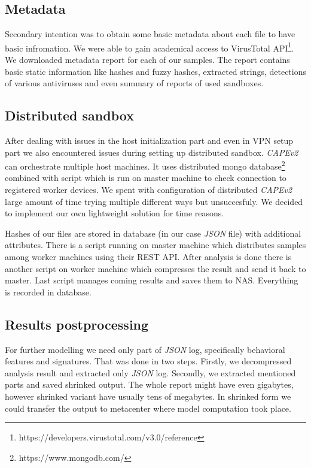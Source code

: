 \subsection{Metadata}
Secondary intention was to obtain some basic metadata about each file to have basic infromation. We were able to gain academical access to VirusTotal API\footnote{https://developers.virustotal.com/v3.0/reference}. We downloaded metadata report for each of our samples. The report contains basic static information like hashes and fuzzy hashes, extracted strings, detections of various antiviruses and even summary of reports of used sandboxes.

\subsection{Distributed sandbox}
After dealing with issues in the host initialization part and even in VPN setup part we also encountered issues during setting up distributed sandbox. \emph{CAPEv2} can orchestrate multiple host machines. It uses distributed mongo database\footnote{https://www.mongodb.com/} combined with script which is run on master machine to check connection to registered worker devices. We spent with configuration of distributed \emph{CAPEv2} large amount of time trying multiple different ways but unsuccesfuly. We decided to implement our own lightweight solution for time reasons.

Hashes of our files are stored in database (in our case \emph{JSON} file) with additional attributes. There is a script running on master machine which distributes samples among worker machines using their REST API. After analysis is done there is another script on worker machine which compresses the result and send it back to master. Last script manages coming results and saves them to NAS. Everything is recorded in database.

\subsection{Results postprocessing}
For further modelling we need only part of \emph{JSON} log, specifically behavioral features and signatures. That was done in two steps. Firstly, we decompressed analysis result and extracted only \emph{JSON} log. Secondly, we extracted mentioned parts and saved shrinked output. The whole report might have even gigabytes, however shrinked variant have usually tens of megabytes. In shrinked form we could transfer the output to metacenter where model computation took place.


